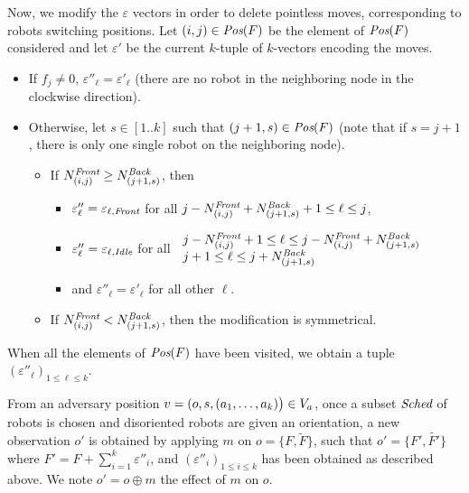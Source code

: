  Now, we modify the $\varepsilon$ vectors  in order to delete pointless moves, corresponding to robots switching positions. 
 Let $(i, j)\in\textit{Pos}(F)$ be the element of $\textit{Pos}(F)$ considered and let $\varepsilon'$ be the current $k$-tuple of $k$-vectors
 encoding the moves. 
 \begin{itemize}
\item If $f_j\neq 0$, $\varepsilon''_\ell=\varepsilon'_\ell$ (there are no robot in the neighboring node in the clockwise direction). 
\item Otherwise, let $s \in [1..k]$ such that $(j+1, s)\in\textit{Pos}(F)$ (note that if $s=j+1$, there is only one single robot on the neighboring node). 
 \begin{itemize}
 \item If $N^{\textit{Front}}_{(i, j)}\geq N^{\textit{Back}}_{(j+1, s)}$, then 
 \begin{itemize}
 \item $\varepsilon''_\ell = \varepsilon_{\ell, \textit{Front}}$ for all $ j-N^{\textit{Front}}_{(i, j)}+N^{\textit{Back}}_{(j+1, s)}+1\leq \ell \leq j$, 
 \item $\varepsilon''_\ell=\varepsilon_{\ell, \textit{Idle}} $ for all $
 	\left.
  		\begin{array}{l}
    			 j-N^{\textit{Front}}_{(i, j)} +1 \leq \ell \leq j-N^{\textit{Front}}_{(i, j)}+  N^{\textit{Back}}_{(j+1, s)} \\
    			j+1 \leq \ell \leq j+N^{\textit{Back}}_{(j+1, s)} \\
  \end{array}
\right.$
 \item and $\varepsilon''_\ell=\varepsilon'_\ell$  for all other  $\ell$.
 \end{itemize}
 \item If $N^{\textit{Front}}_{(i, j)}< N^{\textit{Back}}_{(j+1, s)}$, then the modification is symmetrical. 
 \end{itemize}
 \end{itemize}
 When all the elements of $\textit{Pos}(F)$ have been visited, we obtain a tuple $(\varepsilon''_\ell)_{1\leq \ell \leq k}$.
 
 From an adversary position  $v= (o, s, (a_1, \dots, a_k)\bigr ) \in V_a$, once a subset 
$\textit{Sched}$ of robots is chosen and disoriented robots are given an orientation, 
a new observation $o'$ is obtained by applying $m$ on $o=\{F, \tilde{F}\}$, 
such that $o' =\{F', \tilde{F'}\}$ where $F'= F+\sum_{i=1}^{k} \varepsilon''_i$, and $(\varepsilon''_i)_{1\leq i\leq k}$ 
has been obtained as described above. 
We note $o' = o \oplus m$ the effect of $m$ on $o$.

